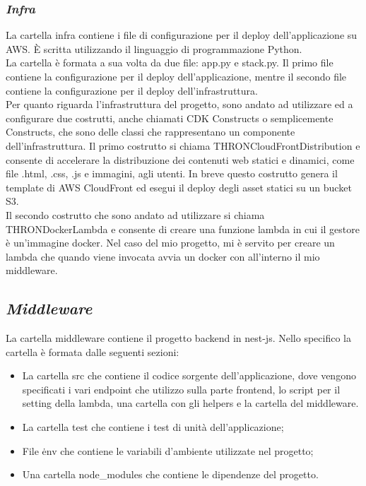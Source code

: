 \subsubsection*{\emph{Infra}}
La cartella infra contiene i file di configurazione per il deploy dell'applicazione su AWS. È scritta utilizzando il linguaggio di programmazione Python.\\
La cartella è formata a sua volta da due file: app.py e stack.py. Il primo file contiene la configurazione per il deploy dell'applicazione, mentre il secondo file contiene la configurazione per il deploy dell'infrastruttura.\\
Per quanto riguarda l'infrastruttura del progetto, sono andato ad utilizzare ed a configurare due costrutti, anche chiamati CDK Constructs o semplicemente Constructs, che sono delle classi che rappresentano un componente dell'infrastruttura.
Il primo costrutto si chiama THRONCloudFrontDistribution e consente di accelerare la distribuzione dei contenuti web statici e dinamici, come file .html, .css, .js e immagini, agli utenti.
In breve questo costrutto genera il template di AWS CloudFront ed esegui il deploy degli asset statici su un bucket S3.\\
Il secondo costrutto che sono andato ad utilizzare si chiama THRONDockerLambda e consente di creare una funzione lambda in cui il gestore è un'immagine docker.
Nel caso del mio progetto, mi è servito per creare un lambda che quando viene invocata avvia un docker con all'interno il mio middleware.\\

\subsection*{\emph{Middleware}}
La cartella middleware contiene il progetto backend in nest-js. Nello specifico la cartella è formata dalle seguenti sezioni:
\begin{itemize}
  \item La cartella src che contiene il codice sorgente dell'applicazione, dove vengono specificati i vari endpoint che utilizzo sulla parte frontend, lo script per il setting
  della lambda, una cartella con gli helpers e la cartella del middleware.
  \item La cartella test che contiene i test di unità dell'applicazione;
  \item File \.env che contiene le variabili d'ambiente utilizzate nel progetto;
  \item Una cartella node\_modules che contiene le dipendenze del progetto.
\end{itemize}
